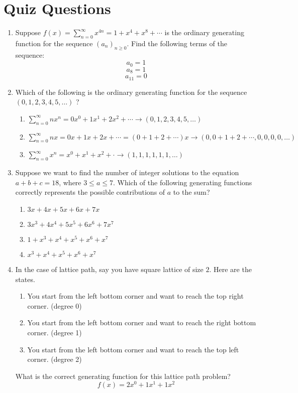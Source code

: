 \documentclass{article}
\theoremstyle{definition}
\begin{document}
\newpage




\section*{Quiz Questions}

\begin{enumerate}
  \item Suppose $f(x)=\sum_{n=0}^{\infty} x^{4 n}=1+x^{4}+x^{8}+\cdots$ 
  is the ordinary generating function for the 
  sequence $\left(a_n\right)_{n \geq 0}$. 
  Find the following terms of the sequence:
  $$
  a_0=1
  $$
  $$
  a_8=1
  $$
  $$
  a_{11}=0
  $$
  \item Which of the following is the ordinary 
  generating function for the sequence 
  $(0,1,2,3,4,5, \ldots)$ ?
\begin{enumerate}
  \item $\sum_{n=0}^{\infty} n x^n = {0} x^{0}+{1} x^{1}+{2} x^{2}+\cdots \to (0,1,2,3,4,5, \ldots)$
  \item $\sum_{n=0}^{\infty} n x = {0} x+{1} x+{2} x+\cdots = ({0} +{1}+{2} +\cdots) x \to  (0,0+1+2+\cdots,0,0,0,0, \ldots)$
  \item $\sum_{n=0}^{\infty} x^n = x^{0} + x^{1} + x^{2} + \cdot \to (1,1,1,1,1,1, \ldots)$
\end{enumerate}
  \item Suppose we want to find the number of integer solutions to the equation $a+b+c=18$, where $3 \leq a \leq 7$. Which of the following generating functions correctly represents the possible contributions of $a$ to the sum?
\begin{enumerate}
  \item $3 x+4 x+5 x+6 x+7 x$
  \item $3 x^3+4 x^4+5 x^5+6 x^6+7 x^7$
  \item $1+x^3+x^4+x^5+x^6+x^7$
  \item $x^3+x^4+x^5+x^6+x^7$
\end{enumerate}


\item In the case of lattice path, say you have square lattice of size $2$.
Here are the states.
\begin{enumerate}
  \item You start from the left bottom corner and want to reach the top right corner. (degree 0)
  \item You start from the left bottom corner and want to reach the right bottom corner. (degree 1)
  \item You start from the left bottom corner and want to reach the top left corner. (degree 2)
\end{enumerate}
What is the correct generating function for this lattice path problem?
\[
  f(x) = 2x^{0} + 1x^{1} + 1x^{2}
\]


\end{enumerate}
\end{document}
